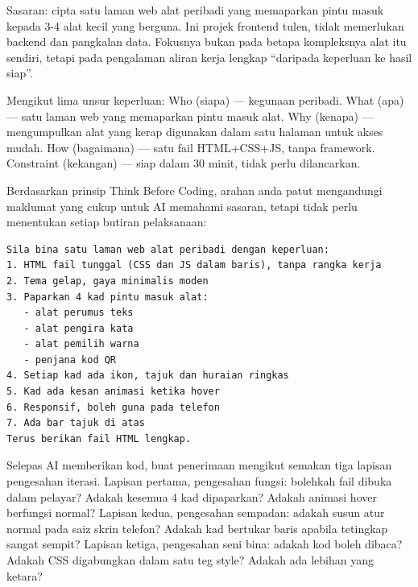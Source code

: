



Sasaran: cipta satu laman web alat peribadi yang memaparkan pintu masuk kepada 3-4 alat kecil yang berguna. Ini projek frontend tulen, tidak memerlukan backend dan pangkalan data. Fokusnya bukan pada betapa kompleksnya alat itu sendiri, tetapi pada pengalaman aliran kerja lengkap “daripada keperluan ke hasil siap”.

Mengikut lima unsur keperluan: Who (siapa) — kegunaan peribadi. What (apa) — satu laman web yang memaparkan pintu masuk alat. Why (kenapa) — mengumpulkan alat yang kerap digunakan dalam satu halaman untuk akses mudah. How (bagaimana) — satu fail HTML+CSS+JS, tanpa framework. Constraint (kekangan) — siap dalam 30 minit, tidak perlu dilancarkan.


Berdasarkan prinsip Think Before Coding, arahan anda patut mengandungi maklumat yang cukup untuk AI memahami sasaran, tetapi tidak perlu menentukan setiap butiran pelaksanaan:

\begin{lstlisting}
Sila bina satu laman web alat peribadi dengan keperluan:
1. HTML fail tunggal (CSS dan JS dalam baris), tanpa rangka kerja
2. Tema gelap, gaya minimalis moden
3. Paparkan 4 kad pintu masuk alat:
   - alat perumus teks
   - alat pengira kata
   - alat pemilih warna
   - penjana kod QR
4. Setiap kad ada ikon, tajuk dan huraian ringkas
5. Kad ada kesan animasi ketika hover
6. Responsif, boleh guna pada telefon
7. Ada bar tajuk di atas
Terus berikan fail HTML lengkap.
\end{lstlisting}


Selepas AI memberikan kod, buat penerimaan mengikut semakan tiga lapisan pengesahan iterasi. Lapisan pertama, pengesahan fungsi: bolehkah fail dibuka dalam pelayar? Adakah kesemua 4 kad dipaparkan? Adakah animasi hover berfungsi normal? Lapisan kedua, pengesahan sempadan: adakah susun atur normal pada saiz skrin telefon? Adakah kad bertukar baris apabila tetingkap sangat sempit? Lapisan ketiga, pengesahan seni bina: adakah kod boleh dibaca? Adakah CSS digabungkan dalam satu teg style? Adakah ada lebihan yang ketara?

